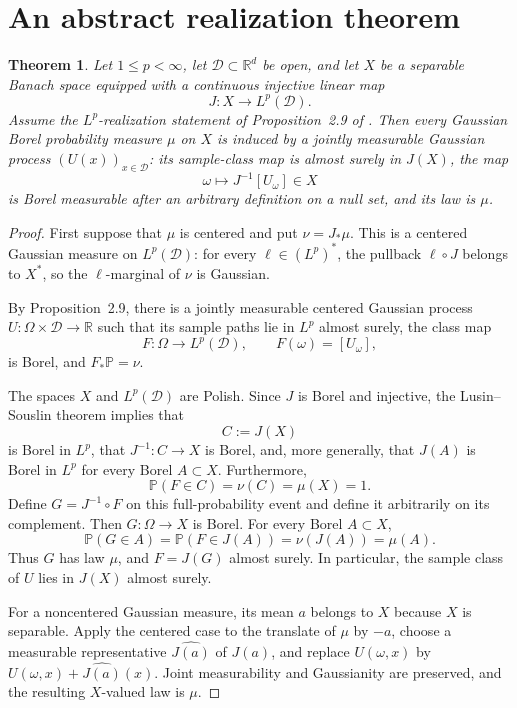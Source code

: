 \documentclass[11pt]{article}
\newtheorem{theorem}{Theorem}
\begin{document}
\section{An abstract realization theorem}

\begin{theorem}\label{thm:abstract}
Let \(1\le p<\infty\), let \(\mathcal D\subset\mathbb R^d\) be open, and
let \(X\) be a separable Banach space equipped with a continuous injective
linear map
\[
 J:X\longrightarrow L^p(\mathcal D).
\]
Assume the \(L^p\)-realization statement of Proposition~2.9 of
\cite{Henderson}.  Then every Gaussian Borel probability measure \(\mu\)
on \(X\) is induced by a jointly measurable Gaussian process
\((U(x))_{x\in\mathcal D}\): its sample-class map is almost surely in
\(J(X)\), the map
\[
 \omega\longmapsto J^{-1}[U_\omega]\in X
\]
is Borel measurable after an arbitrary definition on a null set, and its
law is \(\mu\).
\end{theorem}

\begin{proof}
First suppose that \(\mu\) is centered and put \(\nu=J_*\mu\).  This is a
centered Gaussian measure on \(L^p(\mathcal D)\): for every
\(\ell\in(L^p)^*\), the pullback \(\ell\circ J\) belongs to \(X^*\), so the
\(\ell\)-marginal of \(\nu\) is Gaussian.

By Proposition~2.9, there is a jointly measurable centered Gaussian
process \(U:\Omega\times\mathcal D\to\mathbb R\) such that its sample paths
lie in \(L^p\) almost surely, the class map
\[
 F:\Omega\longrightarrow L^p(\mathcal D),\qquad F(\omega)=[U_\omega],
\]
is Borel, and \(F_*\mathbb P=\nu\).

The spaces \(X\) and \(L^p(\mathcal D)\) are Polish.  Since \(J\) is Borel
and injective, the Lusin--Souslin theorem implies that
\[
 C:=J(X)
\]
is Borel in \(L^p\), that \(J^{-1}:C\to X\) is Borel, and, more generally,
that \(J(A)\) is Borel in \(L^p\) for every Borel \(A\subset X\).
Furthermore,
\[
 \mathbb P(F\in C)=\nu(C)=\mu(X)=1.
\]
Define \(G=J^{-1}\circ F\) on this full-probability event and define it
arbitrarily on its complement.  Then \(G:\Omega\to X\) is Borel.  For
every Borel \(A\subset X\),
\[
 \mathbb P(G\in A)
 =\mathbb P(F\in J(A))
 =\nu(J(A))
 =\mu(A).
\]
Thus \(G\) has law \(\mu\), and \(F=J(G)\) almost surely.  In particular,
the sample class of \(U\) lies in \(J(X)\) almost surely.

For a noncentered Gaussian measure, its mean \(a\) belongs to \(X\) because
\(X\) is separable.  Apply the centered case to the translate of \(\mu\)
by \(-a\), choose a measurable representative \(\widehat{J(a)}\) of
\(J(a)\), and replace \(U(\omega,x)\) by
\(U(\omega,x)+\widehat{J(a)}(x)\).  Joint measurability and Gaussianity are
preserved, and the resulting \(X\)-valued law is \(\mu\).
\end{proof}
\end{document}
